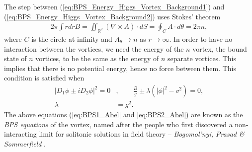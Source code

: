     The step between (\ref{eq:BPS_Energy_Higgs_Vortex_Background1}) and (\ref{eq:BPS_Energy_Higgs_Vortex_Background2}) uses Stokes' theorem
    \begin{align}
        2\pi \int r dr B = \iint_{\mathbb{R}^2}( \nabla \times A) \cdot dS = \oint_C A \cdot d\theta = 2\pi  n,
    \end{align}
where $C$ is the circle at infinity and $A_{\theta} \rightarrow n$ as $r \rightarrow \infty$.
    In order to have no interaction between the vortices, we need the energy of the $n$ vortex, the bound state of $n$ vortices, to be the same as the energy of $n$ separate vortices. This implies that there is no potential energy, hence no force between them. This condition is satisfied when
    \begin{align}
        |D_1\phi \pm i D_2 \phi|^2 =0&,  \qquad \frac{B}{g} \pm \lambda \left(|\phi|^2 -v^2  \right) =0, \label{eq:BPS1_Abel}\\
        \lambda &= g^2 .\label{eq:BPS2_Abel}
    \end{align}
    The above equations (\eqref{eq:BPS1_Abel} and \eqref{eq:BPS2_Abel}) are known as the \textit{BPS equations} of the vortex, named after the people who first discovered a non-interacting limit for solitonic solutions in field theory -- \textit{Bogomol'nyi, Prasad \& Sommerfield} \cite{Bogomolny:1975de} \cite{Prasad:1975kr}.
    

